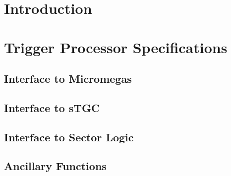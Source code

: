 \documentclass[USenglish]{latex/atlasdoc}
\begin{document}
\tableofcontents
\newpage



\section{Introduction}
\label{sec:intro}


\section{Trigger Processor Specifications}
\label{sec:specs}

\subsection{Interface to Micromegas}
\label{sec:specs-mm}

\subsection{Interface to sTGC}
\label{sec:specs-stgc}


\subsection{Interface to Sector Logic}
\label{sec:specs-sl}

\FloatBarrier

\subsection{Ancillary Functions}
\label{sec:specs-ancillary}


%
\end{document}
